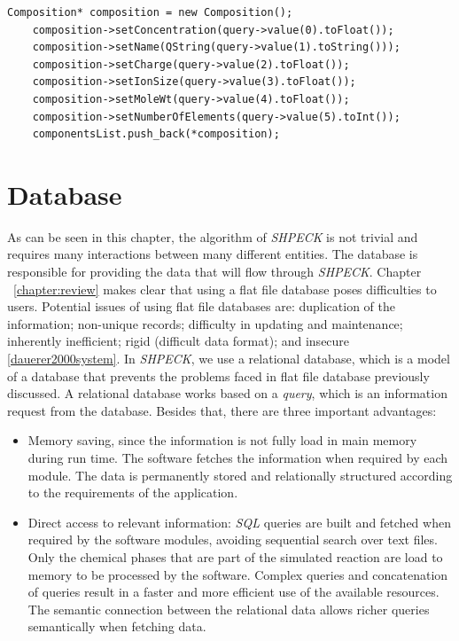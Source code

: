 \begin{minipage}{0.8\linewidth}
\begin{lstlisting}[frame=single, label=cod:waterMethodSavingComponent, caption=Detailed composition of the water]
    Composition* composition = new Composition();
    composition->setConcentration(query->value(0).toFloat());
    composition->setName(QString(query->value(1).toString()));
    composition->setCharge(query->value(2).toFloat());
    composition->setIonSize(query->value(3).toFloat());
    composition->setMoleWt(query->value(4).toFloat());
    composition->setNumberOfElements(query->value(5).toInt());
    componentsList.push_back(*composition);
\end{lstlisting}
\end{minipage}

\section{Database}
As can be seen in this chapter, the algorithm of \emph{SHPECK} is not trivial and requires many interactions between many different entities. The database is responsible for providing the data that will flow through \emph{SHPECK}. Chapter ~\ref{chapter:review} makes clear that using a flat file database poses difficulties to users. Potential issues of using flat file databases are: duplication of the information; non-unique records; difficulty in updating and maintenance; inherently inefficient; rigid (difficult data format); and insecure \ref{dauerer2000system}. 
In \emph{SHPECK}, we use a relational database, which is a model of a database that prevents the problems faced in flat file database previously discussed. A relational database works based on a \emph{query}, which is an information request from the database. Besides that, there are three important advantages:
\begin{itemize}
\item Memory saving, since the information is not fully load in main memory during run time. The software fetches the information when required by each module. The data is permanently stored and relationally structured according to the requirements of the application.
\item Direct access to relevant information: \emph{SQL} queries are built and fetched when required by the software modules, avoiding sequential search over text files.  Only the chemical phases that are part of the simulated reaction are load to memory to be processed by the software. Complex queries and concatenation of queries result in a faster and more efficient use of the available resources. The semantic connection between the relational data allows richer queries semantically when fetching data.
\end{itemize}

